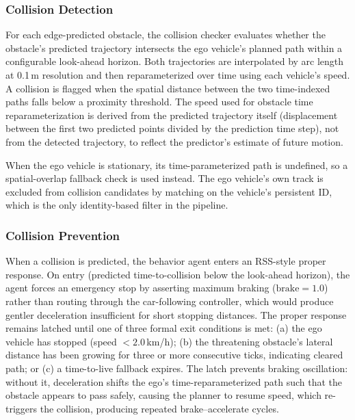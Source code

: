 \subsubsection{Collision Detection}

For each edge-predicted obstacle, the collision checker evaluates whether the obstacle's predicted trajectory intersects the ego vehicle's planned path within a configurable look-ahead horizon. Both trajectories are interpolated by arc length at 0.1\,m resolution and then reparameterized over time using each vehicle's speed. A collision is flagged when the spatial distance between the two time-indexed paths falls below a proximity threshold. The speed used for obstacle time reparameterization is derived from the predicted trajectory itself (displacement between the first two predicted points divided by the prediction time step), not from the detected trajectory, to reflect the predictor's estimate of future motion.

When the ego vehicle is stationary, its time-parameterized path is undefined, so a spatial-overlap fallback check is used instead. The ego vehicle's own track is excluded from collision candidates by matching on the vehicle's persistent ID, which is the only identity-based filter in the pipeline.

\subsubsection{Collision Prevention}

When a collision is predicted, the behavior agent enters an RSS-style proper response. On entry (predicted time-to-collision below the look-ahead horizon), the agent forces an emergency stop by asserting maximum braking ($\mathrm{brake} = 1.0$) rather than routing through the car-following controller, which would produce gentler deceleration insufficient for short stopping distances. The proper response remains latched until one of three formal exit conditions is met: (a) the ego vehicle has stopped (speed $< 2.0$\,km/h); (b) the threatening obstacle's lateral distance has been growing for three or more consecutive ticks, indicating cleared path; or (c) a time-to-live fallback expires. The latch prevents braking oscillation: without it, deceleration shifts the ego's time-reparameterized path such that the obstacle appears to pass safely, causing the planner to resume speed, which re-triggers the collision, producing repeated brake--accelerate cycles.






